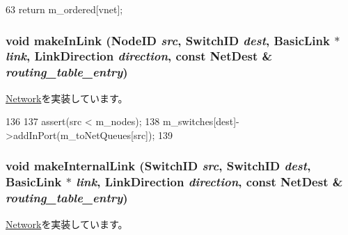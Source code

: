 \begin{DoxyCode}
63 { return m_ordered[vnet]; }
\end{DoxyCode}
\hypertarget{classSimpleNetwork_ac4cf8ff50e877f26606c24880c73fb9d}{
\subsubsection[{makeInLink}]{\setlength{\rightskip}{0pt plus 5cm}void makeInLink ({\bf NodeID} {\em src}, \/  {\bf SwitchID} {\em dest}, \/  {\bf BasicLink} $\ast$ {\em link}, \/  LinkDirection {\em direction}, \/  const {\bf NetDest} \& {\em routing\_\-table\_\-entry})}}
\label{classSimpleNetwork_ac4cf8ff50e877f26606c24880c73fb9d}


\hyperlink{classNetwork_a989337badc16737935316d1faa84a017}{Network}を実装しています。


\begin{DoxyCode}
136 {
137     assert(src < m_nodes);
138     m_switches[dest]->addInPort(m_toNetQueues[src]);
139 }
\end{DoxyCode}
\hypertarget{classSimpleNetwork_a035f37231d3a7edcadd92b7d9e17d4e4}{
\subsubsection[{makeInternalLink}]{\setlength{\rightskip}{0pt plus 5cm}void makeInternalLink ({\bf SwitchID} {\em src}, \/  {\bf SwitchID} {\em dest}, \/  {\bf BasicLink} $\ast$ {\em link}, \/  LinkDirection {\em direction}, \/  const {\bf NetDest} \& {\em routing\_\-table\_\-entry})}}
\label{classSimpleNetwork_a035f37231d3a7edcadd92b7d9e17d4e4}


\hyperlink{classNetwork_adc0a708d423af0acbe045a50a46d7b03}{Network}を実装しています。



